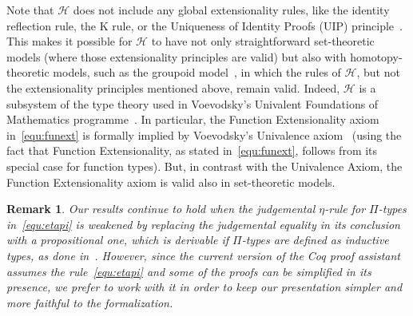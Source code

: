 \documentclass[10pt,a4paper,oneside,reqno]{amsart}
\numberwithin{equation}{section}
\theoremstyle{mythm}
\theoremstyle{mydef}
\theoremstyle{myrmk}
\newtheorem*{remark*}{Remark}
\newcommand{\Hint}{\mathcal{H}}
\begin{document}
 Note that $\Hint$ 
does not include any global extensionality rules, like the identity reflection rule, the K rule, or 
the Uniqueness of Identity Proofs (UIP) principle~\cite{StreicherT:invitt}. This makes it possible
for $\Hint$ to have not only straightforward set-theoretic models (where those extensionality
principles are valid) but also with homotopy-theoretic models, such as the groupoid model~\cite{HofmannM:gromtt}, in which the rules of $\Hint$, but not the extensionality principles mentioned above, remain valid. Indeed, $\Hint$ is a subsystem of the type theory 
used in Voevodsky's Univalent Foundations of Mathematics programme~\cite{VoevodskyV:unifc}. 
In particular, the 
Function Extensionality axiom in~\eqref{equ:funext} is formally implied by Voevodsky's Univalence axiom~\cite{VoevodskyV:notts} (using the fact that Function Extensionality, as stated in~\eqref{equ:funext}, follows from its special case for function types). But, in contrast with the Univalence
Axiom, the Function Extensionality axiom is valid also in set-theoretic models. 




\begin{remark*} Our results continue to hold when the judgemental $\eta$-rule for $\Pi$-types in~\eqref{equ:etapi}
is weakened by replacing the judgemental equality in its conclusion with a propositional one, which is
derivable if $\Pi$-types are defined as inductive types, as done in~\cite{NordstromB:promlt}. However, since the
current version of the Coq proof assistant assumes the rule~\eqref{equ:etapi} and some of the proofs can be 
simplified in its presence, we prefer to work with it in order to keep our presentation simpler and 
more faithful to the formalization.
\end{remark*}


 
\end{document}
